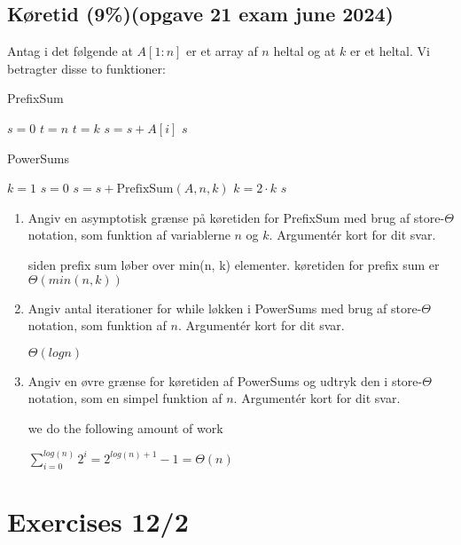 \documentclass{article}
\theoremstyle{definition}
\begin{document}
\subsection{Køretid (9\%)(opgave 21 exam june 2024)}
Antag i det følgende at $A[1:n]$ er et array af $n$ heltal og at $k$ er et heltal. Vi betragter disse to funktioner:

\begin{algorithm}
\caption{PrefixSum}
\begin{algorithmic}[1]
\State $s = 0$
    \State $t = n$
\Else
    \State $t = k$
\EndIf
{}
    \State $s = s + A[i]$
\EndFor
\State \Return $s$
\end{algorithmic}
\end{algorithm}

\begin{algorithm}
\caption{PowerSums}
\begin{algorithmic}[1]
\State $k = 1$
\State $s = 0$
    \State $s = s + \text{PrefixSum}(A, n, k)$
    \State $k = 2 \cdot k$
\EndWhile
\State \Return $s$
\end{algorithmic}
\end{algorithm}

\begin{enumerate}
    \item Angiv en asymptotisk grænse på køretiden for PrefixSum med brug af store-$\Theta$ notation, som funktion af variablerne $n$ og $k$. Argumentér kort for dit svar.
    
    siden prefix sum løber over min(n, k) elementer. køretiden for prefix sum er $\Theta(min(n, k))$

    \item Angiv antal iterationer for while løkken i PowerSums med brug af store-$\Theta$ notation, som funktion af $n$. Argumentér kort for dit svar.
    
    $\Theta(log n)$

    \item Angiv en øvre grænse for køretiden af PowerSums og udtryk den i store-$\Theta$ notation, som en simpel funktion af $n$. Argumentér kort for dit svar.
    
    we do the following amount of work

    $\sum_{i=0}^{log(n)} 2^i = 2^{log(n)+1} - 1= \Theta(n) $

\end{enumerate}

\section{Exercises 12/2}
\end{document}
